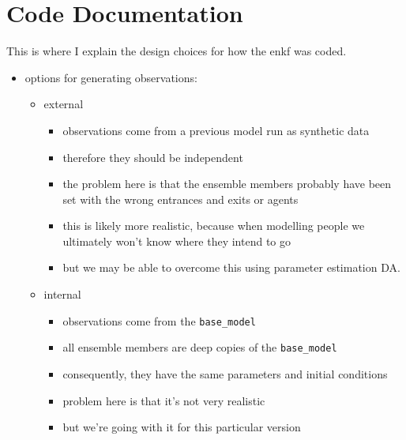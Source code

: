 \appendix
\chapter{Code Documentation}\label{app:code_docs}

This is where I explain the design choices for how the enkf was coded.

\begin{itemize}
    \item options for generating observations:
        \begin{itemize}
            \item external
                \begin{itemize}
                    \item observations come from a previous model run as
                    synthetic data
                    \item therefore they should be independent
                    \item the problem here is that the ensemble members probably
                    have been set with the wrong entrances and exits or agents
                    \item this is likely more realistic, because when modelling
                    people we ultimately won't know where they intend to go
                    \item but we may be able to overcome this using parameter
                    estimation DA.
                \end{itemize}
            \item internal
                \begin{itemize}
                    \item observations come from the \texttt{base\_model}
                    \item all ensemble members are deep copies of the
                    \texttt{base\_model}
                    \item consequently, they have the same parameters and
                    initial conditions
                    \item problem here is that it's not very realistic
                    \item but we're going with it for this particular version
                \end{itemize}
        \end{itemize}
\end{itemize}

